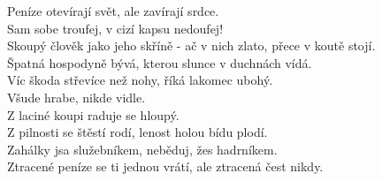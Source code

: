 \begin{multicols}{\value{columnsgames}}
Peníze otevírají svět, ale zavírají srdce.\\
Sam sobe troufej, v cizí kapsu nedoufej!\\
Skoupý člověk jako jeho skříně - ač v nich zlato, přece v koutě
stojí.\\
Špatná hospodyně bývá, kterou slunce v duchnách vídá.\\
Víc škoda střevíce než nohy, říká lakomec ubohý.\\
Všude hrabe, nikde vidle.\\
Z laciné koupi raduje se hloupý.\\
Z pilnosti se štěstí rodí, lenost holou bídu plodí.\\
Zahálky jsa služebníkem, neběduj, žes hadrníkem.\\
Ztracené peníze se ti jednou vrátí, ale ztracená čest nikdy.\\


\end{multicols}
